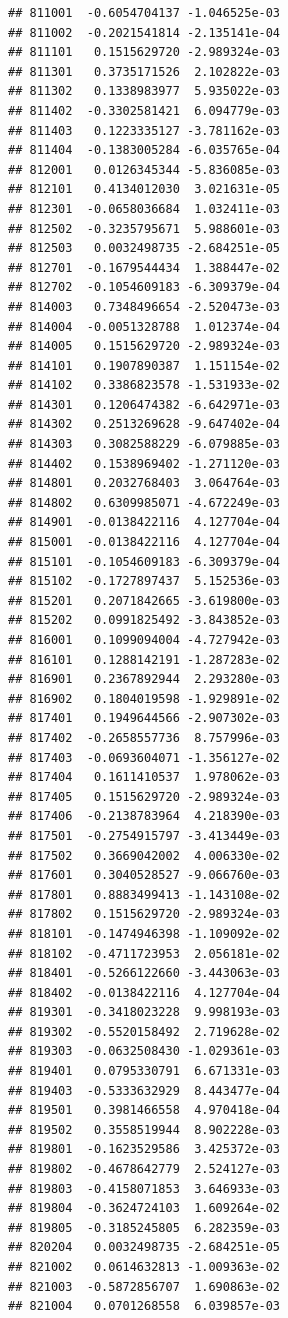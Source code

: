 \begin{frame}[fragile]
\begin{verbatim}
## 811001  -0.6054704137 -1.046525e-03
## 811002  -0.2021541814 -2.135141e-04
## 811101   0.1515629720 -2.989324e-03
## 811301   0.3735171526  2.102822e-03
## 811302   0.1338983977  5.935022e-03
## 811402  -0.3302581421  6.094779e-03
## 811403   0.1223335127 -3.781162e-03
## 811404  -0.1383005284 -6.035765e-04
## 812001   0.0126345344 -5.836085e-03
## 812101   0.4134012030  3.021631e-05
## 812301  -0.0658036684  1.032411e-03
## 812502  -0.3235795671  5.988601e-03
## 812503   0.0032498735 -2.684251e-05
## 812701  -0.1679544434  1.388447e-02
## 812702  -0.1054609183 -6.309379e-04
## 814003   0.7348496654 -2.520473e-03
## 814004  -0.0051328788  1.012374e-04
## 814005   0.1515629720 -2.989324e-03
## 814101   0.1907890387  1.151154e-02
## 814102   0.3386823578 -1.531933e-02
## 814301   0.1206474382 -6.642971e-03
## 814302   0.2513269628 -9.647402e-04
## 814303   0.3082588229 -6.079885e-03
## 814402   0.1538969402 -1.271120e-03
## 814801   0.2032768403  3.064764e-03
## 814802   0.6309985071 -4.672249e-03
## 814901  -0.0138422116  4.127704e-04
## 815001  -0.0138422116  4.127704e-04
## 815101  -0.1054609183 -6.309379e-04
## 815102  -0.1727897437  5.152536e-03
## 815201   0.2071842665 -3.619800e-03
## 815202   0.0991825492 -3.843852e-03
## 816001   0.1099094004 -4.727942e-03
## 816101   0.1288142191 -1.287283e-02
## 816901   0.2367892944  2.293280e-03
## 816902   0.1804019598 -1.929891e-02
## 817401   0.1949644566 -2.907302e-03
## 817402  -0.2658557736  8.757996e-03
## 817403  -0.0693604071 -1.356127e-02
## 817404   0.1611410537  1.978062e-03
## 817405   0.1515629720 -2.989324e-03
## 817406  -0.2138783964  4.218390e-03
## 817501  -0.2754915797 -3.413449e-03
## 817502   0.3669042002  4.006330e-02
## 817601   0.3040528527 -9.066760e-03
## 817801   0.8883499413 -1.143108e-02
## 817802   0.1515629720 -2.989324e-03
## 818101  -0.1474946398 -1.109092e-02
## 818102  -0.4711723953  2.056181e-02
## 818401  -0.5266122660 -3.443063e-03
## 818402  -0.0138422116  4.127704e-04
## 819301  -0.3418023228  9.998193e-03
## 819302  -0.5520158492  2.719628e-02
## 819303  -0.0632508430 -1.029361e-03
## 819401   0.0795330791  6.671331e-03
## 819403  -0.5333632929  8.443477e-04
## 819501   0.3981466558  4.970418e-04
## 819502   0.3558519944  8.902228e-03
## 819801  -0.1623529586  3.425372e-03
## 819802  -0.4678642779  2.524127e-03
## 819803  -0.4158071853  3.646933e-03
## 819804  -0.3624724103  1.609264e-02
## 819805  -0.3185245805  6.282359e-03
## 820204   0.0032498735 -2.684251e-05
## 821002   0.0614632813 -1.009363e-02
## 821003  -0.5872856707  1.690863e-02
## 821004   0.0701268558  6.039857e-03

\end{verbatim}
\end{frame}

